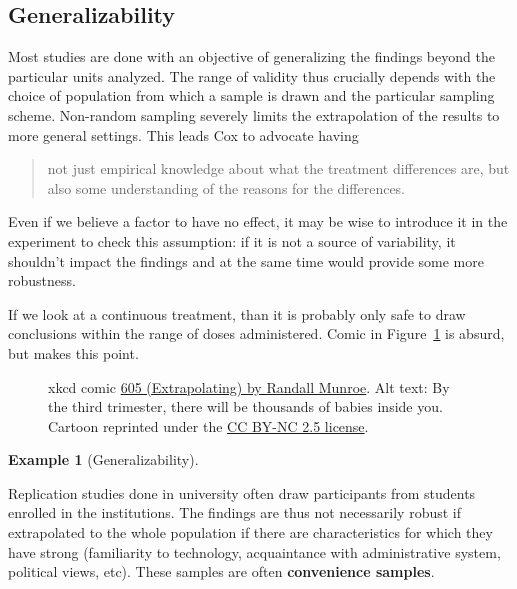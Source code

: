 \documentclass[
  11pt,
  letterpaper,
]{scrbook}
\theoremstyle{definition}
\theoremstyle{definition}
\newtheorem{example}{Example}[chapter]
\theoremstyle{remark}
\begin{document}
\subsection{Generalizability}\label{generalizability}

Most studies are done with an objective of generalizing the findings
beyond the particular units analyzed. The range of validity thus
crucially depends with the choice of population from which a sample is
drawn and the particular sampling scheme. Non-random sampling severely
limits the extrapolation of the results to more general settings. This
leads Cox to advocate having

\begin{quote}
not just empirical knowledge about what the treatment differences are,
but also some understanding of the reasons for the differences.
\end{quote}

Even if we believe a factor to have no effect, it may be wise to
introduce it in the experiment to check this assumption: if it is not a
source of variability, it shouldn't impact the findings and at the same
time would provide some more robustness.

If we look at a continuous treatment, than it is probably only safe to
draw conclusions within the range of doses administered. Comic in
Figure~\ref{fig-xkcd605} is absurd, but makes this point.

\begin{figure}[ht!]


\caption{\label{fig-xkcd605}xkcd comic \href{https://xkcd.com/605/}{605
(Extrapolating) by Randall Munroe}. Alt text: By the third trimester,
there will be thousands of babies inside you. Cartoon reprinted under
the \href{https://creativecommons.org/licenses/by-nc/2.5/}{CC BY-NC 2.5
license}.}

\end{figure}%

\begin{example}[Generalizability]\protect\hypertarget{exm-generalizability}{}\label{exm-generalizability}

Replication studies done in university often draw participants from
students enrolled in the institutions. The findings are thus not
necessarily robust if extrapolated to the whole population if there are
characteristics for which they have strong (familiarity to technology,
acquaintance with administrative system, political views, etc). These
samples are often \textbf{convenience samples}.

\end{example}
\end{document}
